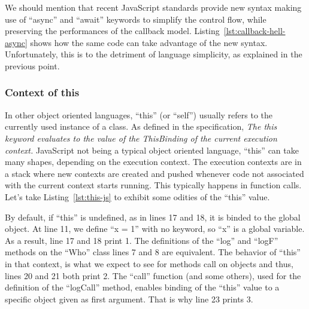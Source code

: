 

We should mention that recent JavaScript standards provide new syntax
making use of ``async'' and ``await'' keywords to simplify
the control flow, while preserving the performances of
the callback model.
Listing~\ref{lst:callback-hell-async} shows how the same code can take advantage of the new syntax.
Unfortunately, this is to the detriment of language simplicity,
as explained in the previous point.



\subsubsection{Context of this}%
\label{ssub:context_of_this}

In other object oriented languages,
``this'' (or ``self'') usually refers to the currently used instance of a class.
As defined in the specification,
\textit{The this keyword evaluates to the value of the ThisBinding of the current execution context.}
JavaScript not being a typical object oriented language,
``this'' can take many shapes, depending on the execution context.
The execution contexts are in a stack where new contexts are created and pushed
whenever code not associated with the current context starts running.
This typically happens in function calls.
Let's take Listing~\ref{lst:this-js} to exhibit some odities of the ``this'' value.



By default, if ``this'' is undefined, as in lines 17 and 18,
it is binded to the global object.
At line 11, we define ``x = 1'' with no keyword,
so ``x'' is a global variable.
As a result, line 17 and 18 print 1.
The definitions of the ``log'' and ``logF'' methods on the ``Who'' class
lines 7 and 8 are equivalent. The behavior of ``this'' in that context,
is what we expect to see for methods call on objects and thus,
lines 20 and 21 both print 2.
The ``call'' function (and some others), used for the definition of the ``logCall'' method,
enables binding of the ``this'' value to a specific object given as first argument.
That is why line 23 prints 3.

